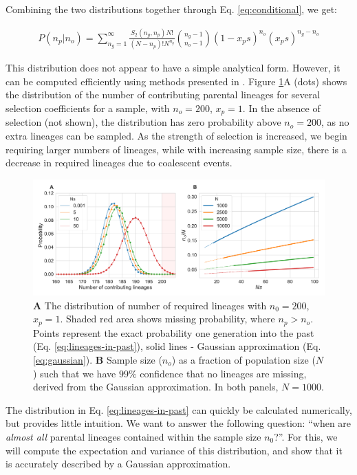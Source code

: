 \documentclass[review]{elsarticle}
\begin{document}
Combining the two distributions together through Eq. \ref{eq:conditional}, we get:

\begin{align}
  \label{eq:lineages-in-past}
   P(n_p|n_o) = \sum_{n_g=1}^{\infty} \frac{S_2(n_g,n_p) N!}{(N-n_p)! N^{n_g}} \binom{n_g-1}{n_o-1}(1-x_ps)^{n_o}(x_ps)^{n_g-n_o}
\end{align}

This distribution does not appear to have a simple analytical form. However, it can be computed
efficiently using methods presented in \citep{ONeill2019}. Figure \ref{fig:combined}A (dots) shows
the distribution of the number of contributing parental lineages for several selection coefficients
for a sample, with $n_o=200$, $x_p=1$. In the absence of selection (not shown), the distribution has
zero probability above $n_o=200$, as no extra lineages can be sampled. As the strength of selection
is increased, we begin requiring larger numbers of lineages, while with increasing sample size,
there is a decrease in required lineages due to coalescent events.

\begin{figure}
  \centering
  \includegraphics[width=\textwidth]{fig/combined.pdf}
  \caption{\textbf{A} The distribution of number of required lineages with $n_0=200$, $x_p=1$. Shaded
    red area shows missing probability, where $n_p > n_o$. Points represent the exact probability one
    generation into the past (Eq. \ref{eq:lineages-in-past}), solid lines - Gaussian approximation
    (Eq. \ref{eq:gaussian}). \textbf{B} Sample size ($n_o$) as a fraction of population size ($N$)
    such that we have $99\%$ confidence that no lineages are missing, derived from the Gaussian
    approximation. In both panels, $N=1000$.}
  \label{fig:combined}
\end{figure}

The distribution in Eq. \ref{eq:lineages-in-past} can quickly be calculated numerically, but
provides little intuition. We want to answer the following question: ``when are \textit{almost all}
parental lineages contained within the sample size $n_0$?''. For this, we will compute the
expectation and variance of this distribution, and show that it is accurately described by a
Gaussian approximation.
\end{document}
